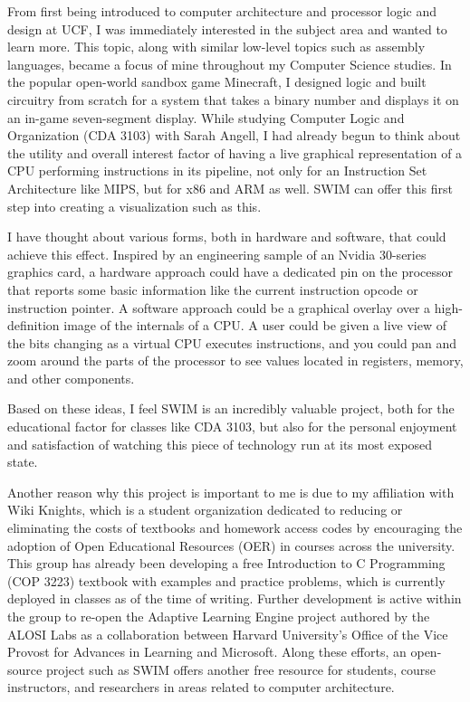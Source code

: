 \documentclass[
    paper=letter,
    parskip=half,
    fontsize=12pt,
    titlepage=firstiscover,
    toc=bibliography,
    numbers=endperiod
]{scrartcl}
\begin{document}
From first being introduced to computer architecture and processor logic and design at UCF, I was immediately interested in the subject area and wanted to learn more. This topic, along with similar low-level topics such as assembly languages, became a focus of mine throughout my Computer Science studies. In the popular open-world sandbox game Minecraft, I designed logic and built circuitry from scratch for a system that takes a binary number and displays it on an in-game seven-segment display. While studying Computer Logic and Organization (CDA 3103) with Sarah Angell, I had already begun to think about the utility and overall interest factor of having a live graphical representation of a CPU performing instructions in its pipeline, not only for an Instruction Set Architecture like MIPS, but for x86 and ARM as well. SWIM can offer this first step into creating a visualization such as this.


I have thought about various forms, both in hardware and software, that could achieve this effect. Inspired by an engineering sample of an Nvidia 30-series graphics card, a hardware approach could have a dedicated pin on the processor that reports some basic information like the current instruction opcode or instruction pointer. A software approach could be a graphical overlay over a high-definition image of the internals of a CPU. A user could be given a live view of the bits changing as a virtual CPU executes instructions, and you could pan and zoom around the parts of the processor to see values located in registers, memory, and other components.

Based on these ideas, I feel SWIM is an incredibly valuable project, both for the educational factor for classes like CDA 3103, but also for the personal enjoyment and satisfaction of watching this piece of technology run at its most exposed state.

Another reason why this project is important to me is due to my affiliation with Wiki Knights, which is a student organization dedicated to reducing or eliminating the costs of textbooks and homework access codes by encouraging the adoption of Open Educational Resources (OER) in courses across the university. This group has already been developing a free Introduction to C Programming (COP 3223) textbook with examples and practice problems, which is currently deployed in classes as of the time of writing. Further development is active within the group to re-open the Adaptive Learning Engine project authored by the ALOSI Labs as a collaboration between Harvard University's Office of the Vice Provost for Advances in Learning and Microsoft. Along these efforts, an open-source project such as SWIM offers another free resource for students, course instructors, and researchers in areas related to computer architecture.
\end{document}
